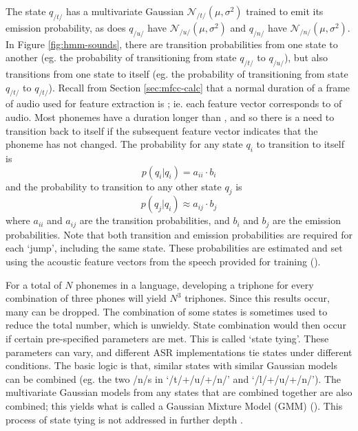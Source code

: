 The state $q_{/t/}$ has a multivariate Gaussian $\mathcal{N}_{/t/}(\mu,\sigma^2)$ trained to emit its emission probability, as does $q_{/u/}$ have $\mathcal{N}_{/u/}(\mu,\sigma^2)$ and $q_{/n/}$ have $\mathcal{N}_{/n/}(\mu,\sigma^2)$.  In Figure \ref{fig:hmm-sounds}, there are transition probabilities from one state to another (eg. the probability of transitioning from state $q_{/t/}$ to $q_{/u/}$), but also transitions from one state to itself (eg. the probability of transitioning from state $q_{/t/}$ to $q_{/t/}$).  Recall from Section \ref{sec:mfcc-calc} that a normal duration of a frame of audio used for feature extraction is \DIFdelbegin {}\DIFdelend \DIFaddbegin {}\DIFaddend ; ie. each feature vector corresponds to \DIFdelbegin {}\DIFdelend \DIFaddbegin {}\DIFaddend of audio.  Most phonemes have a duration longer than \DIFdelbegin {}\DIFdelend \DIFaddbegin {}\DIFaddend , and so there is a need to transition back to itself if the subsequent feature vector indicates that the phoneme has not changed.  The probability for any state $q_i$ to transition to itself is \begin{equation} p(q_i|q_i) = a_{ii}\cdot b_i \end{equation} and the probability to transition to any other state $q_j$ is \begin{equation} p(q_j|q_i) \approx a_{ij}\cdot b_j \end{equation} where $a_{ii}$ and $a_{ij}$ are the transition probabilities, and $b_i$ and $b_j$ are the emission probabilities.  Note that both transition and emission probabilities are required for each `jump', including \DIFdelbegin {}\DIFdelend \DIFaddbegin {}\DIFaddend the same state.  These probabilities are estimated and set using the acoustic feature vectors from the speech provided for training (\cite{gales:07}).

For a total of $N$ phonemes in a language, developing a triphone for every combination of three phones will yield $N^3$ triphones.  Since this results \DIFdelbegin {}\DIFdelend \DIFaddbegin {}\DIFaddend occur, many can be dropped.  The combination of some states is sometimes used to reduce the total number, which is unwieldy.  State combination would then occur if certain pre-specified parameters are met.  This is called `state tying'. These parameters can vary, and different ASR implementations tie states under different conditions.  The basic logic is that, similar states with similar Gaussian models can be combined (eg. the two /n/s in `/t/+/u/+/n/' and `/l/+/u/+/n/').  The multivariate Gaussian models from any states that are combined together are also combined; this yields what is called a Gaussian Mixture Model (GMM) (\cite{gales:07}).  This process of state tying is not addressed in further depth \DIFaddbegin {}\DIFaddend .

